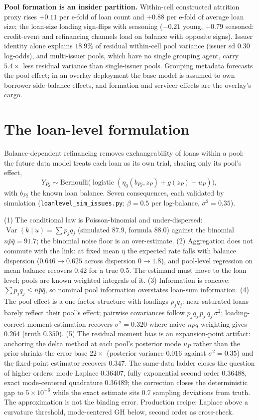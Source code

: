 \documentclass[11pt]{article}
\begin{document}
\textbf{Pool formation is an insider partition.} Within-cell constructed attrition proxy
rises $+0.11$ per e-fold of loan count and $+0.88$ per e-fold of average
loan size; the loan-size loading sign-flips with seasoning ($-0.21$ young,
$+0.79$ seasoned: credit-event and refinancing channels load on balance
with opposite signs). Issuer identity alone explains $18.9\%$ of residual
within-cell pool variance (issuer sd $0.30$ log-odds), and multi-issuer
pools, which have no single grouping agent, carry $5.4\times$ less
residual variance than single-issuer pools. Grouping metadata forecasts
the pool effect; in an overlay deployment the base model is assumed to own
borrower-side balance effects, and formation and servicer effects are the
overlay's cargo.

\section{The loan-level formulation}\label{sec:loanlevel}

Balance-dependent refinancing removes exchangeability of loans within a
pool: the future data model treats each loan as its own trial, sharing
only its pool's effect,
\[
Y_{Pj}\sim\mathrm{Bernoulli}\bigl(\operatorname{logistic}(\eta_0(b_{Pj},z_P)
+ g(z_P) + u_P)\bigr),
\]
with $b_{Pj}$ the known loan balance. Seven consequences, each validated
by simulation (\texttt{loanlevel\_sim\_issues.py}; $\beta=0.5$ per
log-balance, $\sigma^2=0.35$).

(1) The conditional law is Poisson-binomial and under-dispersed:
$\operatorname{Var}(k\mid u)=\sum p_jq_j$ (simulated $87.9$, formula
$88.0$) against the binomial $n\bar p\bar q = 91.7$; the binomial noise
floor is an over-estimate. (2) Aggregation does not commute with the
link: at fixed mean $\eta$ the expected rate falls with balance
dispersion ($0.646\to0.625$ across dispersion $0\to1.8$), and pool-level
regression on mean balance recovers $0.42$ for a true $0.5$. The
estimand must move to the loan level; pools are known weighted integrals
of it. (3) Information is concave: $\sum p_jq_j \le n\bar p\bar q$, so
nominal pool information overstates loan-sum information. (4) The pool
effect is a one-factor structure with loadings $p_jq_j$: near-saturated
loans barely reflect their pool's effect; pairwise covariances follow
$p_jq_j\,p_{j'}q_{j'}\sigma^2$; loading-correct moment estimation
recovers $\sigma^2 = 0.320$ where naive $npq$ weighting gives $0.264$
(truth $0.350$). (5) The residual moment bias is an expansion-point
artifact: anchoring the delta method at each pool's posterior mode
$\hat u_P$ rather than the prior shrinks the error base $22\times$
(posterior variance $0.016$ against $\sigma^2=0.35$) and the
fixed-point estimator recovers $0.347$. The same-data ladder closes the
question of higher orders: mode Laplace $0.36407$, fully exponential
second order $0.36488$, exact mode-centered quadrature $0.36489$; the
correction closes the deterministic gap to $5\times10^{-6}$ while the
exact estimate sits $0.7$ sampling deviations from truth. The
approximation is not the binding error. Production recipe: Laplace above
a curvature threshold, mode-centered GH below, second order as
cross-check.
\end{document}
